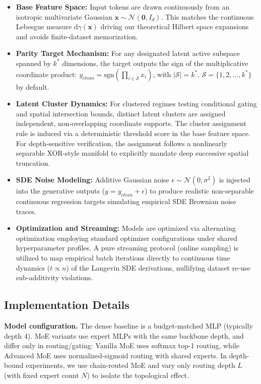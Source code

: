 \documentclass{article}
\newcommand{\1}{\mathbb{I}}
\newcommand{\diff}{\mathrm{d}}
\newcommand{\bx}{\mathbf{x}}
\newcommand{\calN}{\mathcal{N}}
\newcommand{\sgn}{\mathrm{sgn}}
\begin{document}
\begin{itemize}[leftmargin=2em]
    \item \textbf{Base Feature Space:} Input tokens are drawn continuously from an isotropic multivariate Gaussian $\bx \sim \calN(\mathbf{0}, I_d)$. This matches the continuous Lebesgue measure $\diff\gamma(\bx)$ driving our theoretical Hilbert space expansions and avoids finite-dataset memorization.
    \item \textbf{Parity Target Mechanism:} For any designated latent active subspace spanned by $k^*$ dimensions, the target outputs the sign of the multiplicative coordinate product: $y_{clean} = \sgn(\prod_{i \in \mathcal{S}} x_i)$, with $|\mathcal{S}|=k^*$. $\mathcal{S} = \{1,2,...,k^*\}$ by default.
    \item \textbf{Latent Cluster Dynamics:} For clustered regimes testing conditional gating and spatial intersection bounds, distinct latent clusters are assigned independent, non-overlapping coordinate supports. The cluster assignment rule is induced via a deterministic threshold score in the base feature space. For depth-sensitive verification, the assignment follows a nonlinearly separable XOR-style manifold to explicitly mandate deep successive spatial truncation.
    \item \textbf{SDE Noise Modeling:} Additive Gaussian noise $\epsilon \sim \calN(0, \sigma^2)$ is injected into the generative outputs ($y = y_{clean} + \epsilon$) to produce realistic non-separable continuous regression targets simulating empirical SDE Brownian noise traces.
    \item \textbf{Optimization and Streaming:} Models are optimized via alternating optimization employing standard optimizer configurations under shared hyperparameter profiles. A pure streaming protocol (online sampling) is utilized to map empirical batch iterations directly to continuous time dynamics ($t \propto n$) of the Langevin SDE derivations, nullifying dataset re-use sub-additivity violations.
\end{itemize}

\subsection{Implementation Details}
\label{implementation details}
\textbf{Model configuration.} The dense baseline is a budget-matched MLP (typically depth 4). MoE variants use expert MLPs with the same backbone depth, and differ only in routing/gating: Vanilla MoE uses softmax top-1 routing, while Advanced MoE uses normalized-sigmoid routing with shared experts. In depth-bound experiments, we use chain-routed MoE and vary only routing depth $L$ (with fixed expert count $N$) to isolate the topological effect.
\end{document}
